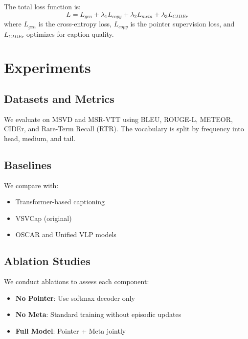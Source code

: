 \documentclass[journal]{IEEEtran}
\begin{document}
The total loss function is:
\begin{equation}
L = L_{gen} + \lambda_1 L_{copy} + \lambda_2 L_{meta} + \lambda_3 L_{CIDEr}
\end{equation}
where $L_{gen}$ is the cross-entropy loss, $L_{copy}$ is the pointer supervision loss, and $L_{CIDEr}$ optimizes for caption quality.




\section{Experiments}
\subsection{Datasets and Metrics}
We evaluate on MSVD and MSR-VTT using BLEU, ROUGE-L, METEOR, CIDEr, and Rare-Term Recall (RTR). The vocabulary is split by frequency into head, medium, and tail.

\subsection{Baselines}
We compare with:
\begin{itemize}
    \item Transformer-based captioning
    \item VSVCap (original)
    \item OSCAR and Unified VLP models
\end{itemize}

\subsection{Ablation Studies}
We conduct ablations to assess each component:
\begin{itemize}
    \item \textbf{No Pointer}: Use softmax decoder only
    \item \textbf{No Meta}: Standard training without episodic updates
    \item \textbf{Full Model}: Pointer + Meta jointly
\end{itemize}
\end{document}
